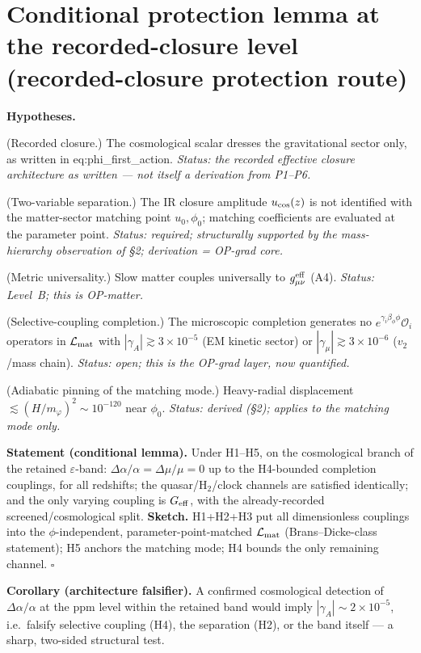 \documentclass[11pt,a4paper]{article}
\begin{document}
\section{Conditional protection lemma at the recorded-closure level
(recorded-closure protection route)}
\textbf{Hypotheses.}
\begin{description}[leftmargin=1.9em,itemsep=2pt]
\item[H1.] (Recorded closure.) The cosmological scalar dresses the gravitational
sector only, as written in eq:phi\_first\_action. \emph{Status: the recorded
effective closure architecture as written --- not itself a derivation from
P1--P6.}
\item[H2.] (Two-variable separation.) The IR closure amplitude $u_{\rm cos}(z)$
is not identified with the matter-sector matching point $u_0,\phi_0$; matching
coefficients are evaluated at the parameter point. \emph{Status: required;
structurally supported by the mass-hierarchy observation of \S2; derivation =
OP-grad core.}
\item[H3.] (Metric universality.) Slow matter couples universally to
$g^{\rm eff}_{\mu\nu}$ (A4). \emph{Status: Level~B; this is OP-matter.}
\item[H4.] (Selective-coupling completion.) The microscopic completion generates
no $e^{\gamma_i\beta_\phi\phi}\mathcal O_i$ operators in $\mathcal L_{\rm mat}$
with $|\gamma_A|\gtrsim3\times10^{-5}$ (EM kinetic sector) or
$|\gamma_\mu|\gtrsim3\times10^{-6}$ ($v_2$/mass chain). \emph{Status: open; this
is the OP-grad layer, now quantified.}
\item[H5.] (Adiabatic pinning of the matching mode.) Heavy-radial displacement
$\lesssim(H/m_\varphi)^2\sim10^{-120}$ near $\phi_0$. \emph{Status: derived
(\S2); applies to the matching mode only.}
\end{description}
\textbf{Statement (conditional lemma).} Under H1--H5, on the cosmological branch
of the retained $\varepsilon$-band: $\Delta\alpha/\alpha=\Delta\mu/\mu=0$ up to
the H4-bounded completion couplings, for all redshifts; the quasar/H$_2$/clock
channels are satisfied identically; and the only varying coupling is
$G_{\rm eff}$, with the already-recorded screened/cosmological split.
\textbf{Sketch.} H1+H2+H3 put all dimensionless couplings into the
$\phi$-independent, parameter-point-matched $\mathcal L_{\rm mat}$
(Brans--Dicke-class statement); H5 anchors the matching mode; H4 bounds the only
remaining channel. $\square$

\textbf{Corollary (architecture falsifier).} A confirmed cosmological detection
of $\Delta\alpha/\alpha$ at the ppm level within the retained band would imply
$|\gamma_A|\sim2\times10^{-5}$, i.e.\ falsify selective coupling (H4), the
separation (H2), or the band itself --- a sharp, two-sided structural test.
\end{document}
